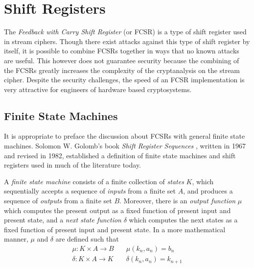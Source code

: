\section{Shift Registers}
\par The {\it Feedback with Carry Shift Register} (or FCSR) is a type of
shift register used in stream ciphers. Though there exist attacks against
this type of shift register by itself, it is possible to combine FCSRs
together in ways that no known attacks are useful. This however does not
guarantee security because the combining of the FCSRs greatly increases the
complexity of the cryptanalysis on the stream cipher. Despite the security
challenges, the speed of an FCSR implementation is very attractive for
engineers of hardware based cryptosystems.

\subsection{Finite State Machines}
\par It is appropriate to preface the discussion about FCSRs with general finite
state machines. Solomon W. Golomb's book {\em Shift Register Sequences}
\cite{bk:g82}, written in 1967 and revised in 1982, established a definition of
finite state machines and shift
registers used in much of the literature today.


\begin{definition}\label{finite-state-machine}
  A {\em finite state machine} consists of a finite collection of {\em states}
  $K$, which sequentially accepts a sequence of {\em inputs} from a finite set
  $A$, and produces a sequence of {\em outputs} from a finite set
  $B$. Moreover, there is an {\em output function} $\mu$ which computes
  the present output as a fixed function of present input and present state,
  and a
  {\em next state function} $\delta$ which computes the next states as a fixed
  function of present input and present state. In a more mathematical manner,
  $\mu$ and $\delta$ are defined such that
  \begin{eqnarray}
    \mu:K \times A \rightarrow B \quad &\mu(k_n,a_n)=b_n \\
    \delta:K \times A \rightarrow K \quad &\delta(k_n,a_n)=k_{n+1}
  \end{eqnarray}
\end{definition}

